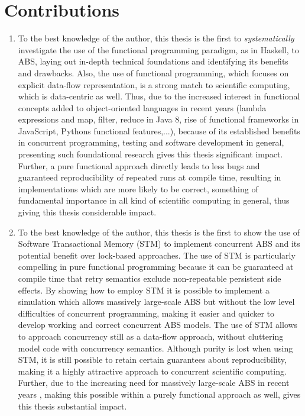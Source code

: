 \section{Contributions}
\begin{enumerate}
	\item To the best knowledge of the author, this thesis is the first to \textit{systematically} investigate the use of the functional programming paradigm, as in Haskell, to ABS, laying out in-depth technical foundations and identifying its benefits and drawbacks. Also, the use of functional programming, which focuses on explicit data-flow representation, is a strong match to scientific computing, which is data-centric as well. Thus, due to the increased interest in functional concepts added to object-oriented languages in recent years (lambda expressions and map, filter, reduce in Java 8, rise of functional frameworks in JavaScript, Pythons functional features,...), because of its established benefits in concurrent programming, testing and software development in general, presenting such foundational research gives this thesis significant impact. Further, a pure functional approach directly leads to less bugs and guaranteed reproducibility of repeated runs at compile time, resulting in implementations which are more likely to be correct, something of fundamental importance in all kind of scientific computing in general, thus giving this thesis considerable impact.
	
	\item To the best knowledge of the author, this thesis is the first to show the use of Software Transactional Memory (STM) to implement concurrent ABS and its potential benefit over lock-based approaches. The use of STM is particularly compelling in pure functional programming because it can be guaranteed at compile time that retry semantics exclude non-repeatable persistent side effects. By showing how to employ STM it is possible to implement a simulation which allows massively large-scale ABS but without the low level difficulties of concurrent programming, making it easier and quicker to develop working and correct concurrent ABS models. The use of STM allows to approach concurrency still as a data-flow approach, without cluttering model code with concurrency semantics. Although purity is lost when using STM, it is still possible to retain certain guarantees about reproducibility, making it a highly attractive approach to concurrent scientific computing. Further, due to the increasing need for massively large-scale ABS in recent years \cite{lysenko_framework_2008}, making this possible within a purely functional approach as well, gives this thesis substantial impact.
	

\end{enumerate}
